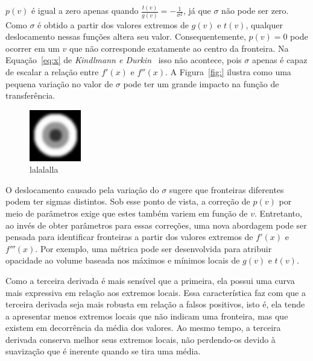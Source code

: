 	$ p(v) $ é igual a zero apenas quando $ \frac{t(v)}{g(v)} = -\frac{1}{\sigma^{2}} $, já que $ \sigma $ não pode ser zero. Como $ \sigma $ é obtido a partir dos valores extremos de $ g(v) $ e $ t(v) $, qualquer deslocamento nessas funções altera seu valor. Consequentemente, $ p(v) = 0 $ pode ocorrer em um $ v $ que não corresponde exatamente ao centro da fronteira. Na Equação~\eqref{eq:x} de \textit{Kindlmann e Durkin}~\cite{gordon} isso não acontece, pois $ \sigma $ apenas é capaz de escalar a relação entre $ f'(x) $ e $ f''(x) $. A Figura~\ref{fig:} ilustra como uma pequena variação no valor de $ \sigma $ pode ter um grande impacto na função de transferência.
	
\begin{figure}
	\centering
	\includegraphics[width=0.2\textwidth]{images/m_triple_sphere_slice}
	\caption{lalalalla}
	\label{}
\end{figure}
	
	O deslocamento causado pela variação do $ \sigma $ sugere que fronteiras diferentes podem ter sigmas distintos. Sob esse ponto de vista, a correção de $ p(v) $ por meio de parâmetros exige que estes também variem em função de $ v $. Entretanto, ao invés de obter parâmetros para essas correções, uma nova abordagem pode ser pensada para identificar fronteiras a partir dos valores extremos de $ f'(x) $ e $ f'''(x) $. Por exemplo, uma métrica pode ser desenvolvida para atribuir opacidade ao volume baseada nos máximos e mínimos locais de $ g(v) $ e $ t(v) $.
	
	Como a terceira derivada é mais sensível que a primeira, ela possui uma curva mais expressiva em relação aos extremos locais. Essa característica faz com que a terceira derivada seja mais robusta em relação a falsos positivos, isto é, ela tende a apresentar menos extremos locais que não indicam uma fronteira, mas que existem em decorrência da média dos valores. Ao mesmo tempo, a terceira derivada conserva melhor seus extremos locais, não perdendo-os devido à suavização que é inerente quando se tira uma média.
	
